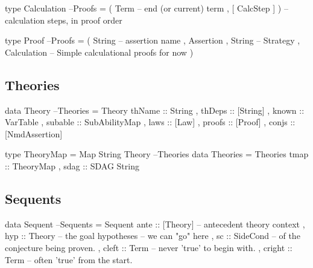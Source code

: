 \begin{code}
type Calculation                                                      --Proofs
  = ( Term -- end (or current) term
    , [ CalcStep ] )  -- calculation steps, in proof order
\end{code}

\begin{code}
type Proof                                                            --Proofs
  = ( String -- assertion name
    , Assertion
    , String -- Strategy
    , Calculation -- Simple calculational proofs for now
    )
\end{code}


\subsection{Theories}

\begin{code}
data Theory                                                         --Theories
  = Theory {
      thName   :: String
    , thDeps   :: [String]
    , known    :: VarTable
    , subable  :: SubAbilityMap
    , laws     :: [Law]
    , proofs   :: [Proof]
    , conjs    :: [NmdAssertion]
    }
\end{code}

\begin{code}
type TheoryMap = Map String Theory                                  --Theories
data Theories
  = Theories { tmap :: TheoryMap
             , sdag :: SDAG String }
\end{code}

\subsection{Sequents}

\begin{code}
data Sequent                                                        --Sequents
  = Sequent {
     ante :: [Theory] -- antecedent theory context
   , hyp :: Theory -- the goal hypotheses -- we can "go" here
   , sc :: SideCond -- of the conjecture being proven.
   , cleft :: Term -- never 'true' to begin with.
   , cright :: Term -- often 'true' from the start.
   }
\end{code}

